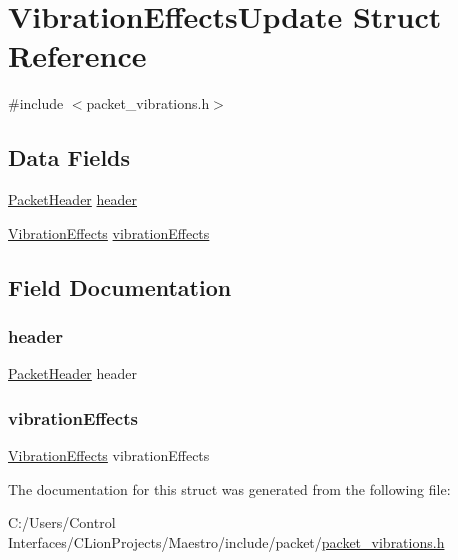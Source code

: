 \hypertarget{struct_vibration_effects_update}{}\section{Vibration\+Effects\+Update Struct Reference}
\label{struct_vibration_effects_update}


{\ttfamily \#include $<$packet\+\_\+vibrations.\+h$>$}

\subsection*{Data Fields}
\begin{DoxyCompactItemize}
\item 
\hyperlink{struct_packet_header}{Packet\+Header} \hyperlink{struct_vibration_effects_update_aaed6c168c58cb4f203b7f5623775d739}{header}
\item 
\hyperlink{struct_vibration_effects}{Vibration\+Effects} \hyperlink{struct_vibration_effects_update_a1c1c18867b035e6d3aeea32b345a1043}{vibration\+Effects}
\end{DoxyCompactItemize}


\subsection{Field Documentation}
\mbox{\label{struct_vibration_effects_update_aaed6c168c58cb4f203b7f5623775d739}} 
\subsubsection{\texorpdfstring{header}{header}}
{\footnotesize\ttfamily \hyperlink{struct_packet_header}{Packet\+Header} header}

\mbox{\label{struct_vibration_effects_update_a1c1c18867b035e6d3aeea32b345a1043}} 
\subsubsection{\texorpdfstring{vibration\+Effects}{vibrationEffects}}
{\footnotesize\ttfamily \hyperlink{struct_vibration_effects}{Vibration\+Effects} vibration\+Effects}



The documentation for this struct was generated from the following file\+:\begin{DoxyCompactItemize}
\item 
C\+:/\+Users/\+Control Interfaces/\+C\+Lion\+Projects/\+Maestro/include/packet/\hyperlink{packet__vibrations_8h}{packet\+\_\+vibrations.\+h}\end{DoxyCompactItemize}

